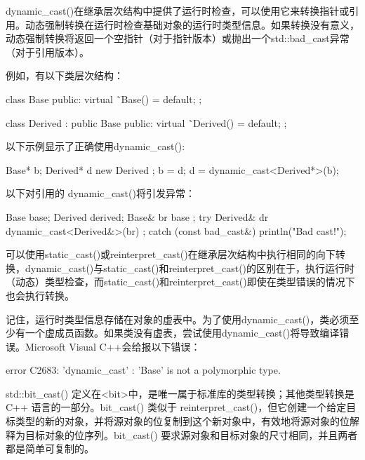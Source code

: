 
dynamic\_cast()在继承层次结构中提供了运行时检查，可以使用它来转换指针或引用。动态强制转换在运行时检查基础对象的运行时类型信息。如果转换没有意义，动态强制转换将返回一个空指针（对于指针版本）或抛出一个std::bad\_cast异常（对于引用版本）。

例如，有以下类层次结构：

\begin{cpp}
class Base
{
    public:
        virtual ˜Base() = default;
};

class Derived : public Base
{
    public:
        virtual ˜Derived() = default;
};
\end{cpp}

以下示例显示了正确使用dynamic\_cast():

\begin{cpp}
Base* b;
Derived* d { new Derived {} };
b = d;
d = dynamic_cast<Derived*>(b);
\end{cpp}

以下对引用的 dynamic\_cast()将引发异常：

\begin{cpp}
Base base;
Derived derived;
Base& br { base };
try {
    Derived& dr { dynamic_cast<Derived&>(br) };
} catch (const bad_cast&) {
    println("Bad cast!");
}
\end{cpp}

可以使用static\_cast()或reinterpret\_cast()在继承层次结构中执行相同的向下转换，dynamic\_cast()与static\_cast()和reinterpret\_cast()的区别在于，执行运行时（动态）类型检查，而static\_cast()和reinterpret\_cast()即使在类型错误的情况下也会执行转换。

记住，运行时类型信息存储在对象的虚表中。为了使用dynamic\_cast()，类必须至少有一个虚成员函数。如果类没有虚表，尝试使用dynamic\_cast()将导致编译错误。Microsoft Visual C++会给报以下错误：

\begin{shell}
error C2683: 'dynamic_cast' : 'Base' is not a polymorphic type.
\end{shell}


std::bit\_cast() 定义在<bit>中，是唯一属于标准库的类型转换；其他类型转换是 C++ 语言的一部分。bit\_cast() 类似于 reinterpret\_cast()，但它创建一个给定目标类型的新的对象，并将源对象的位复制到这个新对象中，有效地将源对象的位解释为目标对象的位序列。bit\_cast() 要求源对象和目标对象的尺寸相同，并且两者都是简单可复制的。

